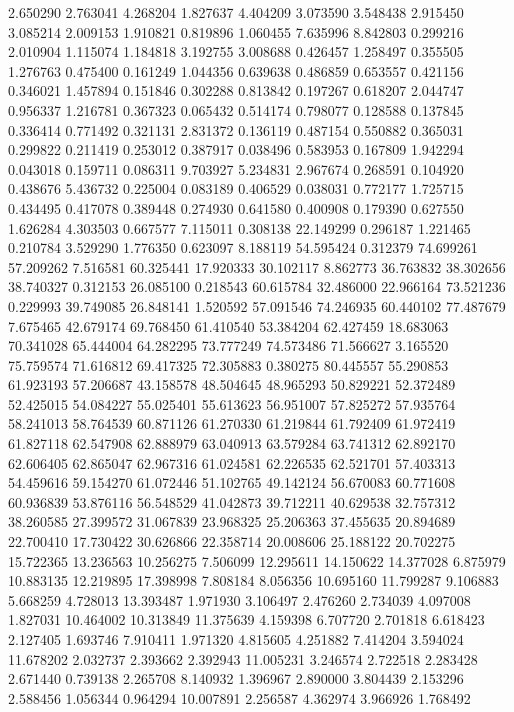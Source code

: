 2.650290
2.763041
4.268204
1.827637
4.404209
3.073590
3.548438
2.915450
3.085214
2.009153
1.910821
0.819896
1.060455
7.635996
8.842803
0.299216
2.010904
1.115074
1.184818
3.192755
3.008688
0.426457
1.258497
0.355505
1.276763
0.475400
0.161249
1.044356
0.639638
0.486859
0.653557
0.421156
0.346021
1.457894
0.151846
0.302288
0.813842
0.197267
0.618207
2.044747
0.956337
1.216781
0.367323
0.065432
0.514174
0.798077
0.128588
0.137845
0.336414
0.771492
0.321131
2.831372
0.136119
0.487154
0.550882
0.365031
0.299822
0.211419
0.253012
0.387917
0.038496
0.583953
0.167809
1.942294
0.043018
0.159711
0.086311
9.703927
5.234831
2.967674
0.268591
0.104920
0.438676
5.436732
0.225004
0.083189
0.406529
0.038031
0.772177
1.725715
0.434495
0.417078
0.389448
0.274930
0.641580
0.400908
0.179390
0.627550
1.626284
4.303503
0.667577
7.115011
0.308138
22.149299
0.296187
1.221465
0.210784
3.529290
1.776350
0.623097
8.188119
54.595424
0.312379
74.699261
57.209262
7.516581
60.325441
17.920333
30.102117
8.862773
36.763832
38.302656
38.740327
0.312153
26.085100
0.218543
60.615784
32.486000
22.966164
73.521236
0.229993
39.749085
26.848141
1.520592
57.091546
74.246935
60.440102
77.487679
7.675465
42.679174
69.768450
61.410540
53.384204
62.427459
18.683063
70.341028
65.444004
64.282295
73.777249
74.573486
71.566627
3.165520
75.759574
71.616812
69.417325
72.305883
0.380275
80.445557
55.290853
61.923193
57.206687
43.158578
48.504645
48.965293
50.829221
52.372489
52.425015
54.084227
55.025401
55.613623
56.951007
57.825272
57.935764
58.241013
58.764539
60.871126
61.270330
61.219844
61.792409
61.972419
61.827118
62.547908
62.888979
63.040913
63.579284
63.741312
62.892170
62.606405
62.865047
62.967316
61.024581
62.226535
62.521701
57.403313
54.459616
59.154270
61.072446
51.102765
49.142124
56.670083
60.771608
60.936839
53.876116
56.548529
41.042873
39.712211
40.629538
32.757312
38.260585
27.399572
31.067839
23.968325
25.206363
37.455635
20.894689
22.700410
17.730422
30.626866
22.358714
20.008606
25.188122
20.702275
15.722365
13.236563
10.256275
7.506099
12.295611
14.150622
14.377028
6.875979
10.883135
12.219895
17.398998
7.808184
8.056356
10.695160
11.799287
9.106883
5.668259
4.728013
13.393487
1.971930
3.106497
2.476260
2.734039
4.097008
1.827031
10.464002
10.313849
11.375639
4.159398
6.707720
2.701818
6.618423
2.127405
1.693746
7.910411
1.971320
4.815605
4.251882
7.414204
3.594024
11.678202
2.032737
2.393662
2.392943
11.005231
3.246574
2.722518
2.283428
2.671440
0.739138
2.265708
8.140932
1.396967
2.890000
3.804439
2.153296
2.588456
1.056344
0.964294
10.007891
2.256587
4.362974
3.966926
1.768492
